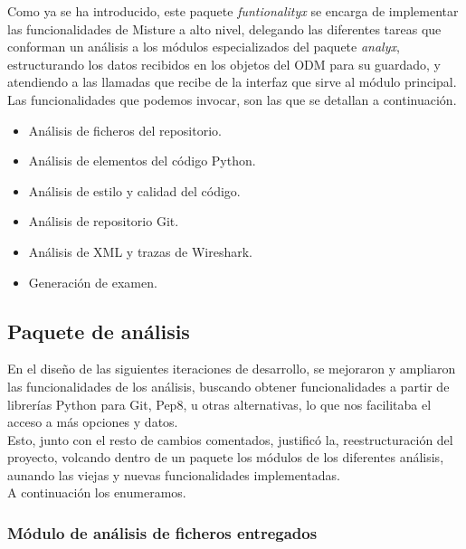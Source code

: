 Como ya se ha introducido, este paquete \textit{funtionalityx} se encarga de implementar las funcionalidades de Misture a alto nivel, delegando las diferentes tareas que conforman un análisis a los módulos especializados del paquete \textit{analyx}, estructurando los datos recibidos en los objetos del ODM para su guardado, y atendiendo a las llamadas que recibe de la interfaz que sirve al módulo principal.\\


Las funcionalidades que podemos invocar, son las que se detallan a continuación.\\

\begin{itemize}
\item Análisis de ficheros del repositorio.

\item Análisis de elementos del código Python.

\item Análisis de estilo y calidad del código.

\item Análisis de repositorio Git.

\item Análisis de XML y trazas de Wireshark.

\item Generación de examen.
\end{itemize}


\subsection{Paquete de análisis} 
\label{subsec:paq_anals}


En el diseño de las siguientes iteraciones de desarrollo, se mejoraron y ampliaron las funcionalidades de los análisis, buscando obtener funcionalidades a partir de librerías Python para Git, Pep8, u otras alternativas, lo que nos facilitaba el acceso a más opciones y datos.\\


Esto, junto con el resto de cambios comentados, justificó la, reestructuración del proyecto, volcando dentro de un paquete los módulos de los diferentes análisis, aunando las viejas y nuevas funcionalidades implementadas.\\

A continuación los enumeramos.


\subsubsection{Módulo de análisis de ficheros entregados} 
\label{subsec:mod_anal_fich}


